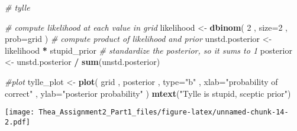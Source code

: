 \documentclass[]{article}
\newenvironment{Shaded}{\begin{snugshade}}{\end{snugshade}}
\newcommand{\KeywordTok}[1]{\textcolor[rgb]{0.13,0.29,0.53}{\textbf{#1}}}
\newcommand{\DataTypeTok}[1]{\textcolor[rgb]{0.13,0.29,0.53}{#1}}
\newcommand{\DecValTok}[1]{\textcolor[rgb]{0.00,0.00,0.81}{#1}}
\newcommand{\StringTok}[1]{\textcolor[rgb]{0.31,0.60,0.02}{#1}}
\newcommand{\CommentTok}[1]{\textcolor[rgb]{0.56,0.35,0.01}{\textit{#1}}}
\newcommand{\OperatorTok}[1]{\textcolor[rgb]{0.81,0.36,0.00}{\textbf{#1}}}
\newcommand{\NormalTok}[1]{#1}
\begin{document}
\begin{Shaded}
\begin{Highlighting}[]
\CommentTok{# tylle}

\CommentTok{# compute likelihood at each value in grid}
\NormalTok{likelihood <-}\StringTok{ }\KeywordTok{dbinom}\NormalTok{( }\DecValTok{2}\NormalTok{ , }\DataTypeTok{size=}\DecValTok{2}\NormalTok{ , }\DataTypeTok{prob=}\NormalTok{grid )}
\CommentTok{# compute product of likelihood and prior}
\NormalTok{unstd.posterior <-}\StringTok{ }\NormalTok{likelihood }\OperatorTok{*}\StringTok{ }\NormalTok{stupid_prior}
\CommentTok{# standardize the posterior, so it sums to 1}
\NormalTok{posterior <-}\StringTok{ }\NormalTok{unstd.posterior }\OperatorTok{/}\StringTok{ }\KeywordTok{sum}\NormalTok{(unstd.posterior)}

\CommentTok{#plot}
\NormalTok{tylle_plot <-}\StringTok{ }\KeywordTok{plot}\NormalTok{( grid , posterior , }\DataTypeTok{type=}\StringTok{"b"}\NormalTok{ ,}
    \DataTypeTok{xlab=}\StringTok{"probability of correct"}\NormalTok{ , }\DataTypeTok{ylab=}\StringTok{"posterior probability"}\NormalTok{ )}
\KeywordTok{mtext}\NormalTok{(}\StringTok{"Tylle is stupid, sceptic prior"}\NormalTok{)}
\end{Highlighting}
\end{Shaded}

\texttt{[image: Thea\_Assignment2\_Part1\_files/figure-latex/unnamed-chunk-14-2.pdf]}
\end{document}
